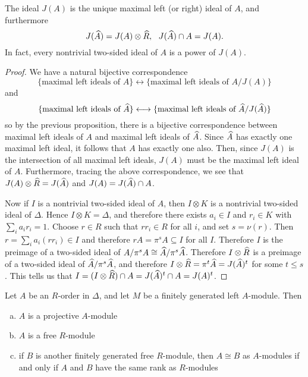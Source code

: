 \begin{thm}
The ideal $J(A)$ is the unique maximal left (or right) ideal of $A$, and furthermore
$$J(\widehat A) = J(A)\otimes\widehat R,\ \ J(\widehat A)\cap A = J(A).$$
In fact, every nontrivial two-sided ideal of $A$ is a power of $J(A)$.
\end{thm}
\begin{proof}
We have a natural bijective correspondence
$$\{\text{maximal left ideals of $A$}\}\longleftrightarrow \{\text{maximal left ideals of $A/J(A)$}\}$$
and
$$\{\text{maximal left ideals of $\widehat A$}\}\longleftrightarrow \{\text{maximal left ideals of $\widehat A/J(\widehat A)$}\}$$
so by the previous proposition, there is a bijective correspondence between maximal left ideals of $A$ and maximal left ideals of $\widehat A$.  Since $\widehat A$ has exactly one maximal left ideal, it follows that $A$ has exactly one also.  Then, since $J(A)$ is the intersection of all maximal left ideals, $J(A)$ must be the maximal left ideal of $A$.  Furthermore, tracing the above correspondence, we see that $J(A)\otimes\widehat R = J(\widehat A)$ and $J(A) = J(\widehat A)\cap A$.

Now if $I$ is a nontrivial two-sided ideal of $A$, then $I\otimes K$ is a nontrivial two-sided ideal of $\Delta$.  Hence $I\otimes K = \Delta$, and therefore there exists $a_i\in I$ and $r_i\in K$ with $\sum_i a_ir_i = 1$.  Choose $r\in R$ such that $rr_i\in R$ for all $i$, and set $s = \nu(r)$.  Then $r = \sum_i a_i(rr_i)\in I$ and therefore $rA = \pi^sA\subseteq I$ for all $I$.  Therefore $I$ is the preimage of a two-sided ideal of $A/\pi^sA\cong \widehat A/\pi^s\widehat A$.  Therefore $I\otimes \widehat R$ is a preimage of a two-sided ideal of $\widehat A/\pi^s\widehat A$, and therefore $I\otimes\widehat R = \pi^t \widehat A = J(\widehat A)^t$ for some $t\leq s$.  This tells us that $I = (I\otimes \widehat R)\cap A = J(\widehat A)^t\cap A = J(A)^t$.
\end{proof}

\begin{lem}
Let $A$ be an $R$-order in $\Delta$, and let $M$ be a finitely generated left $A$-module.  Then
\begin{enumerate}[(a)]
\item  $A$ is a projective $A$-module
\item  $A$ is a free $R$-module
\item  if $B$ is another finitely generated free $R$-module, then $A\cong B$ as $A$-modules if and only if $A$ and $B$ have the same rank as $R$-modules
\end{enumerate}
\end{lem}


